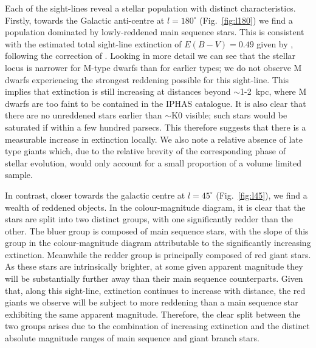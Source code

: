 \documentclass[useAMS,usenatbib]{mn2e}
\begin{document}
Each of the sight-lines reveal a stellar population
with distinct characteristics.
Firstly, towards the Galactic anti-centre 
at $l=180^\circ$ (Fig.~\ref{fig:l180})
we find a population dominated by lowly-reddened main sequence stars.
This is consistent with the estimated total sight-line extinction 
of $E(B-V)=0.49$ given by \cite{Schlegel1998},
following the correction of \cite{Schlafly2011}.
Looking in more detail we can see
that the stellar locus is narrower for M-type dwarfs
than for earlier types;
we do not observe M dwarfs experiencing 
the strongest reddening possible for this sight-line.
This implies that extinction is still increasing 
at distances beyond $\sim$1-2~kpc,
where M dwarfs are too faint to be contained in the IPHAS catalogue.
It is also clear that there are no unreddened stars
earlier than $\sim$K0 visible;
such stars would be saturated if within a few hundred parsecs.
This therefore suggests 
that there is a measurable increase in extinction locally.
We also note a relative absence of late type giants which,
due to the relative brevity 
of the corresponding phase of stellar evolution,
would only account for a small proportion of a volume limited sample.
 
In contrast, 
closer towards the galactic centre
at $l=45^{\circ}$ (Fig.~\ref{fig:l45}),
we find a wealth of reddened objects.
In the colour-magnitude diagram, it is clear
that the stars are split into two distinct groups,
with one significantly redder than the other.
The bluer group is composed of main sequence stars,
with the slope of this group in the colour-magnitude diagram
attributable to the significantly increasing extinction.
Meanwhile the redder group is principally composed of red giant stars.
As these stars are intrinsically brighter,
at some given apparent magnitude they will be substantially further away
than their main sequence counterparts.
Given that, along this sight-line,
extinction continues to increase with distance,
the red giants we observe will be subject to more reddening
than a main sequence star exhibiting the same apparent magnitude.
Therefore, the clear split between the two groups arises
due to the combination of increasing extinction
and the distinct absolute magnitude ranges
of main sequence and giant branch stars.
\end{document}
